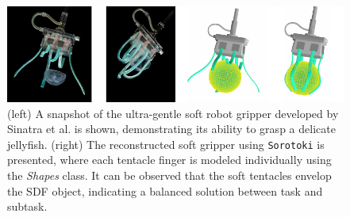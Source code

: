 \begin{figure}[!t]
\centering
\includegraphics*[width=.99\textwidth]{./pdf/thesis-figure-6-13.pdf}
%
\caption{\small (left) A snapshot of the ultra-gentle soft robot gripper developed by Sinatra et al. \cite{Sinatra2019Aug} is shown, demonstrating its ability to grasp a delicate jellyfish. (right) The reconstructed soft gripper using \texttt{Sorotoki} is presented, where each tentacle finger is modeled individually using the \textit{Shapes} class. It can be observed that the soft tentacles envelop the SDF object, indicating a balanced solution between task and subtask.}
\label{fig:C5:shapesexample}
\vspace{-5mm}
\end{figure}

